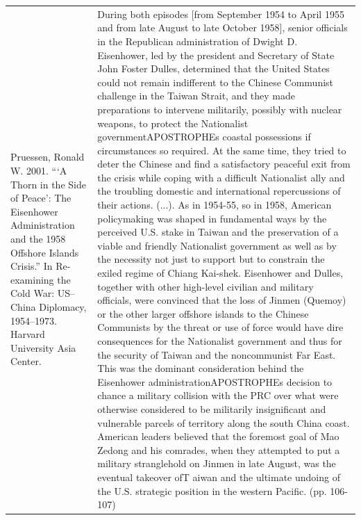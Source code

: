 {\begin{longtable}{p{}p{}}
\\
Pruessen, Ronald W. 2001. “‘A Thorn in the Side of Peace’: The Eisenhower Administration and the 1958 Offshore Islands Crisis.” In Re-examining the Cold War: US–China Diplomacy, 1954–1973. Harvard University Asia Center. & During both episodes [from September 1954 to April 1955 and from late August to late October 1958], senior officials in the Republican administration of Dwight D. Eisenhower, led by the president and Secretary of State John Foster Dulles, determined that the United States could not remain indifferent to the Chinese Communist challenge in the Taiwan Strait, and they made preparations to intervene militarily, possibly with nuclear weapons, to protect the Nationalist governmentAPOSTROPHEs coastal possessions if circumstances so required. At the same time, they tried to deter the Chinese and find a satisfactory peaceful exit from the crisis while coping with a difficult Nationalist ally and the troubling domestic and international repercussions of their actions. (...). As in 1954-55, so in 1958, American policymaking was shaped in fundamental ways by the perceived U.S. stake in Taiwan and the preservation of a viable and friendly Nationalist government as well as by the necessity not just to support but to constrain the exiled regime of Chiang Kai-shek. Eisenhower and Dulles, together with other high-level civilian and military officials, were convinced that the loss of Jinmen (Quemoy) or the other larger offshore islands to the Chinese Communists by the threat or use of force would have dire consequences for the Nationalist government and thus for the security of Taiwan and the noncommunist Far East. This was the dominant consideration behind the Eisenhower administrationAPOSTROPHEs decision to chance a military collision with the PRC over what were otherwise considered to be militarily insignificant and vulnerable parcels of territory along the south China coast. American leaders believed that the foremost goal of Mao Zedong and his comrades, when they attempted to put a military stranglehold on Jinmen in late August, was the eventual takeover ofT aiwan and the ultimate undoing of the U.S. strategic position in the western Pacific. (pp. 106-107)
\\

\end{longtable}}
